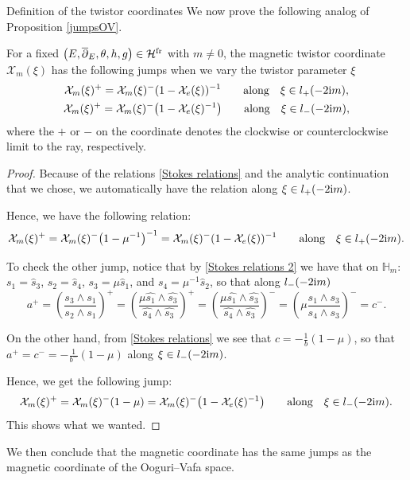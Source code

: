 \begin{subsubsection} {Definition of the twistor coordinates}
We now prove the following analog of Proposition \ref{jumpsOV}.

\begin{Theorem} For a fixed $\bigl(E,\overline{\partial}_E,\theta,h,g\bigr) \in \mathcal{H}^{{\rm fr}}$ with $m\neq 0$, the magnetic twistor coordinate~$\mathcal{X}_m(\xi)$ has the following jumps when we vary the twistor parameter $\xi$
\begin{gather*}
 \mathcal{X}_m(\xi)^{+}=\mathcal{X}_m(\xi)^{-}(1-\mathcal{X}_e(\xi))^{-1} \qquad \text{along} \quad \xi \in l_{+}(-2{\rm i}m),\\
 \mathcal{X}_m(\xi)^{+}=\mathcal{X}_m(\xi)^{-}\bigl(1-\mathcal{X}_e(\xi)^{-1}\bigr) \qquad \text{along} \quad \xi \in l_{-}(-2{\rm i}m),
\end{gather*}
where the $+$ or $-$ on the coordinate denotes the clockwise or counterclockwise limit to the ray, respectively.
\end{Theorem}

\begin{proof}
Because of the relations \eqref{Stokes relations} and the analytic continuation that we chose, we automatically have the relation
 along $ \xi \in l_+(-2{\rm i}m)$.

Hence, we have the following relation:
\begin{equation*}
 \mathcal{X}_m(\xi)^{+}=\mathcal{X}_m(\xi)^{-}\bigl(1-\mu^{-1}\bigr)^{-1}=\mathcal{X}_m(\xi)^{-}(1-\mathcal{X}_e(\xi))^{-1} \qquad \text{along} \quad \xi \in l_{+}(-2{\rm i}m).
\end{equation*}

To check the other jump, notice that by \eqref{Stokes relations 2} we have that on $\mathbb{H}_m$: $s_1=\widehat{s}_3$, $s_2=\widehat{s}_4$, $s_3=\mu \widehat{s}_1$, and $s_4=\mu^{-1} \widehat{s}_2$, so that along $l_-(-2{\rm i}m)$
\begin{equation*}
 a^{+}=\left(\frac{s_3\wedge s_1}{s_2\wedge s_1}\right)^{+}
 = \left(\frac{\mu \widehat{s_1}\wedge \widehat{s_3}}{\widehat{s_4}\wedge \widehat{s_3}}\right)^{+}=\left(\frac{\mu \widehat{s_1}\wedge \widehat{s_3}}{\widehat{s_4}\wedge \widehat{s_3}}\right)^{-}=\left(\mu \frac{s_1\wedge s_3}{s_4\wedge s_3}\right)^{-}=c^-.
\end{equation*}

On the other hand, from \eqref{Stokes relations} we see that
$
 c=-\frac{1}{b}(1-\mu)$,
so that
$
 a^{+}=c^-=-\frac{1}{b^-}(1-\mu)$ along $\xi \in l_-(-2{\rm i}m)$.

Hence, we get the following jump:
\begin{equation*}
 \mathcal{X}_m(\xi)^{+}=\mathcal{X}_m(\xi)^{-}(1-\mu)=\mathcal{X}_m(\xi)^{-}\bigl(1-\mathcal{X}_e(\xi)^{-1}\bigr) \qquad \text{along} \quad \xi \in l_{-}(-2{\rm i}m).
\end{equation*}
This shows what we wanted.
\end{proof}

We then conclude that the magnetic coordinate has the same jumps as the magnetic coordinate of the Ooguri--Vafa space.

\end{subsubsection}


